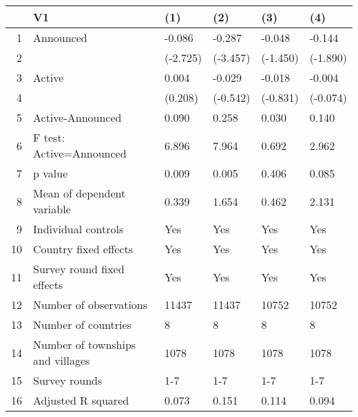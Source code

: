 \begin{table}[ht]
\centering
\begin{tabular}{rlllll}
  \hline
 & V1 & (1) & (2) & (3) & (4) \\ 
  \hline
1 & Announced & -0.086 & -0.287 & -0.048 & -0.144 \\ 
  2 &  & (-2.725) & (-3.457) & (-1.450) & (-1.890) \\ 
  3 & Active & 0.004 & -0.029 & -0.018 & -0.004 \\ 
  4 &  & (0.208) & (-0.542) & (-0.831) & (-0.074) \\ 
  5 & Active-Announced & 0.090 & 0.258 & 0.030 & 0.140 \\ 
  6 & F test: Active=Announced & 6.896 & 7.964 & 0.692 & 2.962 \\ 
  7 & p value & 0.009 & 0.005 & 0.406 & 0.085 \\ 
  8 & Mean of dependent variable & 0.339 & 1.654 & 0.462 & 2.131 \\ 
  9 & Individual controls & Yes & Yes & Yes & Yes \\ 
  10 & Country fixed effects & Yes & Yes & Yes & Yes \\ 
  11 & Survey round fixed effects & Yes & Yes & Yes & Yes \\ 
  12 & Number of observations & 11437 & 11437 & 10752 & 10752 \\ 
  13 & Number of countries & 8 & 8 & 8 & 8 \\ 
  14 & Number of townships and villages & 1078 & 1078 & 1078 & 1078 \\ 
  15 & Survey rounds & 1-7 & 1-7 & 1-7 & 1-7 \\ 
  16 & Adjusted R squared & 0.073 & 0.151 & 0.114 & 0.094 \\ 
   \hline
\end{tabular}
\end{table}
